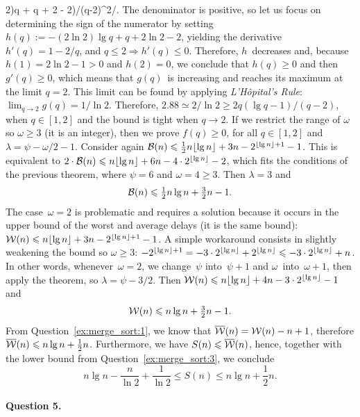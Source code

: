 2)\lg q + q + 2 - 2)/(q-2)^2/\). The denominator is
positive, so let us focus on determining the sign of the numerator by
setting \(h(q) := -(2\ln 2)\lg q + q + 2\ln 2 - 2\), yielding the
derivative \(h'(q) = 1 - 2/q\), and \(q \leqslant 2 \Rightarrow h'(q)
\leqslant 0\). Therefore, \(h\)~decreases and, because \(h(1) = 2\ln2
- 1 > 0\) and \(h(2) = 0\), we conclude that \(h(q) \geqslant 0\) and
then \(g'(q) \geqslant 0\), which means that \(g(q)\)~is increasing
and reaches its maximum at the limit \({q=2}\). This limit can be
found by applying \emph{L'H{\^o}pital's Rule}: \(\lim_{q \rightarrow
  2}g(q) = 1/\ln 2\). Therefore, \(2.88 \simeq 2/\ln 2 \geqslant
2q(\lg q - 1)/(q - 2)\), when \(q \in [1,2]\) and the bound is tight
when \(q \rightarrow 2\). If we restrict the range of \(\omega\) so
\(\omega \geqslant 3\) (it is an integer), then we prove \(f(q)
\geqslant 0\), for all \(q \in [1,2]\) and \(\lambda = \psi - \omega/2
- 1\). Consider again \(\mathcal{B}(n) \leqslant \tfrac{1}{2}{n\lfloor{\lg
    n}\rfloor} + 3n - 2^{\lfloor{\lg n}\rfloor+1} - 1\). This is equivalent to \(2
\cdot \mathcal{B}(n) \leqslant n\lfloor{\lg n}\rfloor + 6n - 4 \cdot 2^{\lfloor{\lg
    n}\rfloor} - 2\), which fits the conditions of the previous theorem,
where \(\psi = 6\) and \(\omega = 4 \geqslant 3\). Then \(\lambda =
3\) and
\[
\mathcal{B}(n) \leqslant \tfrac{1}{2}{n\lg n} + \tfrac{3}{2}n - 1.
\]
The case~\(\omega = 2\) is problematic and requires a solution because
it occurs in the upper bound of the worst and average delays (it is
the same bound): \(\mathcal{W}(n) \leqslant n\lfloor{\lg n}\rfloor + 3n -
2^{\lfloor{\lg n}\rfloor+1} - 1\). A simple workaround consists in slightly
weakening the bound so \(\omega \geqslant 3\): \(-2^{\lfloor{\lg n}\rfloor+1}
= -3 \cdot 2^{\lfloor{\lg n}\rfloor} + 2^{\lfloor{\lg n}\rfloor} \leqslant -3 \cdot
2^{\lfloor{\lg n}\rfloor} + n\). In other words, whenever~\({\omega = 2}\), we
change~\(\psi\) into~\(\psi+1\) and \(\omega\)~into~\(\omega+1\), then
apply the theorem, so \(\lambda = \psi - 3/2\). Then \(\mathcal{W}(n)
\leqslant n\lfloor{\lg n}\rfloor + 4n - 3 \cdot 2^{\lfloor{\lg n}\rfloor} - 1\) and
\[
\mathcal{W}(n) \leqslant n\lg n + \tfrac{3}{2}{n} - 1.
\]
From Question~\ref{ex:merge_sort:1}, we know that \(\overline{\mathcal{W}}(n) =
\mathcal{W}(n) - n + 1\), therefore \(\overline{\mathcal{W}}(n) \leqslant n\lg n +
\tfrac{1}{2}n\). Furthermore, we have \(S(n) \leqslant \overline{\mathcal{W}}(n)\),
hence, together with the lower bound from
Question~\ref{ex:merge_sort:3}, we conclude
\[
n\lg n - \frac{n}{\ln 2} + \frac{1}{\ln 2}
\leqslant S(n) \leqslant n\lg n + \frac{1}{2}{n}.
\]

\medskip

\paragraph{Question 5.}

